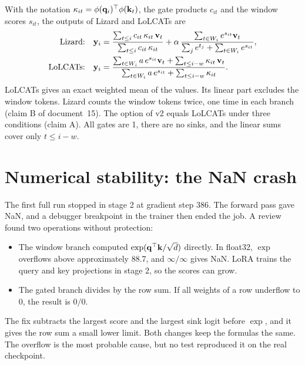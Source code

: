 With the notation $\kappa_{it} = \phi(\mathbf{q}_i)^\top\phi(\mathbf{k}_t)$, the gate products $c_{it}$ and the window scores $s_{it}$, the outputs of Lizard and LoLCATs are
\begin{align}
\text{Lizard:}\quad \mathbf{y}_i &= \frac{\sum_{t \le i} c_{it}\, \kappa_{it}\, \mathbf{v}_t}{\sum_{t \le i} c_{it}\, \kappa_{it}} + \alpha\, \frac{\sum_{t \in W_i} e^{s_{it}} \mathbf{v}_t}{\sum_{j} e^{t_j} + \sum_{t \in W_i} e^{s_{it}}}, \\
\text{LoLCATs:}\quad \mathbf{y}_i &= \frac{\sum_{t \in W_i} a\, e^{s_{it}} \mathbf{v}_t + \sum_{t \le i - w} \kappa_{it}\, \mathbf{v}_t}{\sum_{t \in W_i} a\, e^{s_{it}} + \sum_{t \le i - w} \kappa_{it}} .
\end{align}
LoLCATs gives an exact weighted mean of the values. Its linear part excludes the window tokens. Lizard counts the window tokens twice, one time in each branch (claim B of document~15). The  option of v2 equals LoLCATs under three conditions (claim A). All gates are 1, there are no sinks, and the linear sums cover only $t \le i - w$.

\section{Numerical stability: the NaN crash}
\label{sec:nan}

The first full run stopped in stage 2 at gradient step 386. The forward pass gave NaN, and a debugger breakpoint in the trainer then ended the job. A review found two operations without protection:

\begin{itemize}
\item The window branch computed $\exp(\mathbf{q}^\top\mathbf{k}/\sqrt{d})$ directly. In float32, $\exp$ overflows above approximately 88.7, and $\infty/\infty$ gives NaN. LoRA trains the query and key projections in stage 2, so the scores can grow.
\item The gated branch divides by the row sum. If all weights of a row underflow to 0, the result is $0/0$.
\end{itemize}

The fix subtracts the largest score and the largest sink logit before $\exp$, and it gives the row sum a small lower limit. Both changes keep the formulas the same. The overflow is the most probable cause, but no test reproduced it on the real checkpoint.

